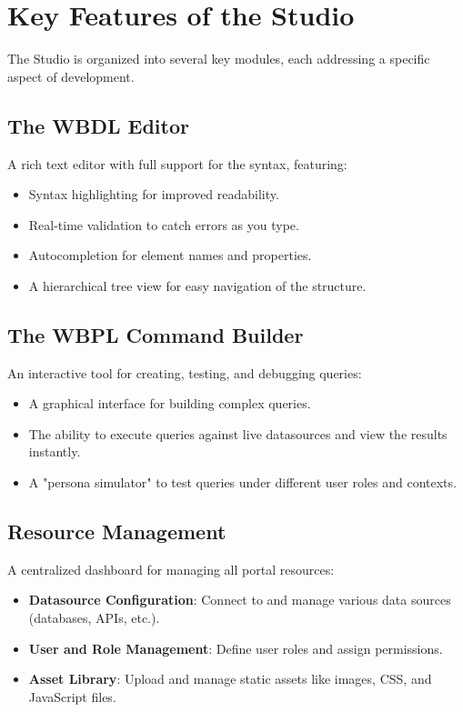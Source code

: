\section{Key Features of the Studio}
\label{sec:studio-features}

The Studio is organized into several key modules, each addressing a specific aspect of \webbase{} development.

\subsection{The WBDL Editor}
A rich text editor with full support for the \wbdl{} syntax, featuring:
\begin{itemize}
    \item Syntax highlighting for improved readability.
    \item Real-time validation to catch errors as you type.
    \item Autocompletion for element names and properties.
    \item A hierarchical tree view for easy navigation of the \webbase{} structure.
\end{itemize}

\subsection{The WBPL Command Builder}
An interactive tool for creating, testing, and debugging \wbpl{} queries:
\begin{itemize}
    \item A graphical interface for building complex queries.
    \item The ability to execute queries against live datasources and view the results instantly.
    \item A "persona simulator" to test queries under different user roles and contexts.
\end{itemize}

\subsection{Resource Management}
A centralized dashboard for managing all portal resources:
\begin{itemize}
    \item \textbf{Datasource Configuration}: Connect to and manage various data sources (databases, APIs, etc.).
    \item \textbf{User and Role Management}: Define user roles and assign permissions.
    \item \textbf{Asset Library}: Upload and manage static assets like images, CSS, and JavaScript files.
\end{itemize}

